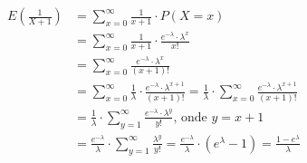 \documentclass[12pt,letterpaper]{article}
\begin{document}
	\begin{equation*}
		\begin{split}
			E(\frac{1}{X+1}) & = \sum_{x=0}^{\infty} \frac{1}{x+1} \cdot P(X=x)\\
			& = \sum_{x=0}^{\infty} \frac{1}{x+1} \cdot \frac{e^{-\lambda}\cdot \lambda^x}{x!} \\
			& = \sum_{x=0}^{\infty} \frac{e^{-\lambda}\cdot \lambda^x}{(x+1)!} \\
			& = \sum_{x=0}^{\infty}\frac{1}{\lambda} \cdot \frac{e^{-\lambda}\cdot \lambda^{x+1}}{(x+1)!} = \frac{1}{\lambda} \cdot \sum_{x=0}^{\infty} \frac{e^{-\lambda}\cdot \lambda^{x+1}}{(x+1)!} \\
			& = \frac{1}{\lambda} \cdot \sum_{y=1}^{\infty} \frac{e^{-\lambda}\cdot \lambda^y}{y!} \text{, onde } y = x+1 \\
			& = \frac{e^{-\lambda}}{\lambda} \cdot \sum_{y=1}^{\infty} \frac{\lambda^y}{y!} = \frac{e^{-\lambda}}{\lambda} \cdot (e^\lambda - 1) = \frac{1 - e^\lambda}{\lambda}
	\end{split}
	\end{equation*}
	
	
\end{document}
